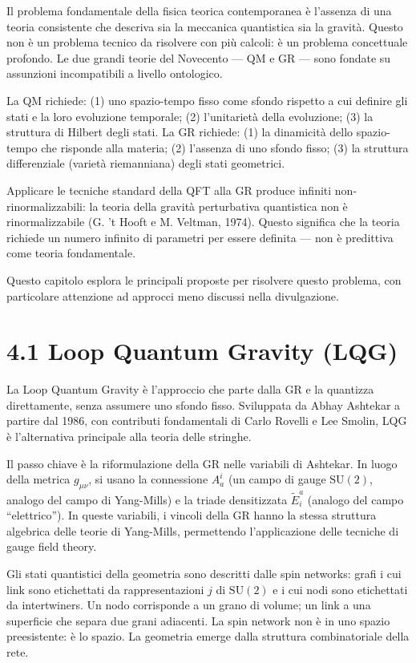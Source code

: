 \documentclass[11.5pt,a4paper,openany]{book}
\theoremstyle{remark}
\begin{document}
Il problema fondamentale della fisica teorica contemporanea è l'assenza di una teoria consistente che descriva sia la meccanica quantistica sia la gravità. Questo non è un problema tecnico da risolvere con più calcoli: è un problema concettuale profondo. Le due grandi teorie del Novecento --- QM e GR --- sono fondate su assunzioni incompatibili a livello ontologico.

La QM richiede: (1) uno spazio-tempo fisso come sfondo rispetto a cui definire gli stati e la loro evoluzione temporale; (2) l'unitarietà della evoluzione; (3) la struttura di Hilbert degli stati. La GR richiede: (1) la dinamicità dello spazio-tempo che risponde alla materia; (2) l'assenza di uno sfondo fisso; (3) la struttura differenziale (varietà riemanniana) degli stati geometrici.

Applicare le tecniche standard della QFT alla GR produce infiniti non-rinormalizzabili: la teoria della gravità perturbativa quantistica non è rinormalizzabile (G. 't Hooft e M. Veltman, 1974). Questo significa che la teoria richiede un numero infinito di parametri per essere definita --- non è predittiva come teoria fondamentale.

Questo capitolo esplora le principali proposte per risolvere questo problema, con particolare attenzione ad approcci meno discussi nella divulgazione.

\section{4.1 Loop Quantum Gravity (LQG)}

La Loop Quantum Gravity è l'approccio che parte dalla GR e la quantizza direttamente, senza assumere uno sfondo fisso. Sviluppata da Abhay Ashtekar a partire dal 1986, con contributi fondamentali di Carlo Rovelli e Lee Smolin, LQG è l'alternativa principale alla teoria delle stringhe.

Il passo chiave è la riformulazione della GR nelle variabili di Ashtekar. In luogo della metrica $g_{\mu\nu}$, si usano la connessione $A_a^i$ (un campo di gauge $\mathrm{SU}(2)$, analogo del campo di Yang-Mills) e la triade densitizzata $\tilde{E}^a_i$ (analogo del campo ``elettrico''). In queste variabili, i vincoli della GR hanno la stessa struttura algebrica delle teorie di Yang-Mills, permettendo l'applicazione delle tecniche di gauge field theory.

Gli stati quantistici della geometria sono descritti dalle spin networks: grafi i cui link sono etichettati da rappresentazioni $j$ di $\mathrm{SU}(2)$ e i cui nodi sono etichettati da intertwiners. Un nodo corrisponde a un grano di volume; un link a una superficie che separa due grani adiacenti. La spin network non è in uno spazio preesistente: è lo spazio. La geometria emerge dalla struttura combinatoriale della rete.
\end{document}
